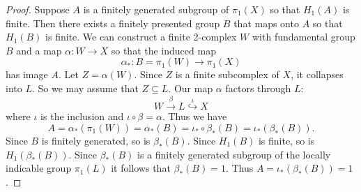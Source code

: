 \documentclass[10pt,a4paper]{amsart}
\begin{document}
\begin{proof}
Suppose $A$ is a finitely generated subgroup of $\pi_1(X)$ so that $H_1(A)$ is finite. Then there exists a finitely presented group $B$ that maps onto $A$ so that $H_1(B)$ is finite.
We can construct a finite 2-complex $W$ with fundamental group $B$ and a map $\alpha\colon W\to X$ so that the induced map 
$$\alpha_*\colon B=\pi_1(W)\to \pi_1(X)$$ has image $A$.
Let $Z=\alpha(W)$. Since $Z$ is a finite subcomplex of $X$, it collapses into $L$. 
So we may assume that $Z\subseteq L$. Our map $\alpha$ factors through $L$:
$$W\stackrel{\beta}{\to} L\stackrel{\iota}\hookrightarrow X$$
where $\iota$ is the inclusion and $\iota\circ \beta=\alpha$. Thus we have 
$$A=\alpha_*(\pi_1(W))=\alpha_*(B)=\iota_*\circ \beta_*(B)=\iota_*(\beta_*(B)).$$
Since $B$ is finitely generated, so is $\beta_*(B)$. Since $H_1(B)$ is finite, so is $H_1(\beta_*(B))$. 
Since $\beta_*(B)$ is a finitely generated subgroup of the locally indicable group $\pi_1(L)$ it follows that $\beta_*(B)=1$. Thus $A=\iota_*(\beta_*(B))=1$.
\end{proof}
\end{document}
